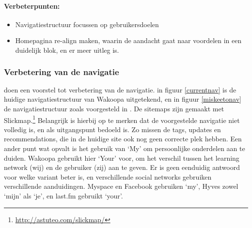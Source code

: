 \documentclass[a4paper, 10pt, pdftex]{report}
\begin{document}
    \paragraph{\textbf{Verbeterpunten:}}
      \begin{itemize}
        \item Navigatiestructuur focussen op gebruikersdoelen
        \item Homepagina re-align maken, waarin de aandacht gaat naar voordelen in een duidelijk blok, en er meer uitleg is.
      \end{itemize}


    \subsubsection{Verbetering van de navigatie}
      \citeauthor{Hoekman2008} doen een voorstel tot verbetering van de navigatie. in figuur \ref{currentnav} is de huidige navigatiestructuur van Wakoopa uitgetekend, en in figuur \ref{miskeetonav} de navigatiestructuur zoals voorgesteld in  \cite{Hoekman2008}. De sitemaps zijn gemaakt met Slickmap.\footnote{\url{http://astuteo.com/slickmap/}} Belangrijk is hierbij op te merken dat de voorgestelde navigatie niet volledig is, en als uitgangspunt bedoeld is. Zo missen de tags, updates en recommendations, die in de huidige site ook nog geen correcte plek hebben. Een ander punt wat opvalt is het gebruik van `My' om persoonlijke onderdelen aan te duiden. Wakoopa gebruikt hier `Your' voor, om het verschil tussen het learning network (wij) en de gebruiker (zij) aan te geven. Er is geen eenduidig antwoord voor welke variant beter is, en verschillende social networks gebruiken verschillende aanduidingen. Myspace en Facebook gebruiken `my', Hyves zowel `mijn' als `je', en last.fm gebruikt `your'.
\end{document}

